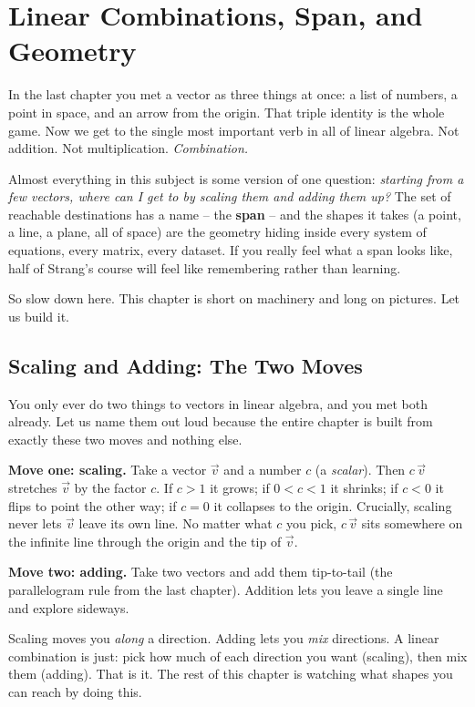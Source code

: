 \chapter{Linear Combinations, Span, and Geometry}

In the last chapter you met a vector as three things at once: a list of numbers, a point in space, and an arrow from the origin. That triple identity is the whole game. Now we get to the single most important verb in all of linear algebra. Not addition. Not multiplication. \emph{Combination.}

Almost everything in this subject is some version of one question: \emph{starting from a few vectors, where can I get to by scaling them and adding them up?} The set of reachable destinations has a name -- the \textbf{span} -- and the shapes it takes (a point, a line, a plane, all of space) are the geometry hiding inside every system of equations, every matrix, every dataset. If you really feel what a span looks like, half of Strang's course will feel like remembering rather than learning.

So slow down here. This chapter is short on machinery and long on pictures. Let us build it.

\section{Scaling and Adding: The Two Moves}

You only ever do two things to vectors in linear algebra, and you met both already. Let us name them out loud because the entire chapter is built from exactly these two moves and nothing else.

\textbf{Move one: scaling.} Take a vector $\vec{v}$ and a number $c$ (a \emph{scalar}). Then $c\,\vec{v}$ stretches $\vec{v}$ by the factor $c$. If $c>1$ it grows; if $0<c<1$ it shrinks; if $c<0$ it flips to point the other way; if $c=0$ it collapses to the origin. Crucially, scaling never lets $\vec{v}$ leave its own line. No matter what $c$ you pick, $c\,\vec{v}$ sits somewhere on the infinite line through the origin and the tip of $\vec{v}$.

\textbf{Move two: adding.} Take two vectors and add them tip-to-tail (the parallelogram rule from the last chapter). Addition lets you leave a single line and explore sideways.

\begin{intuitionbox}
Scaling moves you \emph{along} a direction. Adding lets you \emph{mix} directions. A linear combination is just: pick how much of each direction you want (scaling), then mix them (adding). That is it. The rest of this chapter is watching what shapes you can reach by doing this.
\end{intuitionbox}

